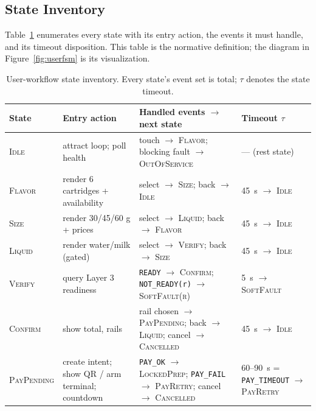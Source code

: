 \subsection{State Inventory}
\label{sec:stateinventory}

Table~\ref{tab:states} enumerates every state with its entry action, the
events it must handle, and its timeout disposition. This table is the
normative definition; the diagram in Figure~\ref{fig:userfsm} is its
visualization.

\begin{table}[htbp]
\centering
\caption{User-workflow state inventory. Every state's event set is total;
$\tau$ denotes the state timeout.}
\label{tab:states}
\footnotesize
\begin{tabular}{@{}p{2.6cm}p{3.3cm}p{4.6cm}p{3.2cm}@{}}
\toprule
\textbf{State} & \textbf{Entry action} & \textbf{Handled events $\rightarrow$ next state} & \textbf{Timeout $\tau$} \\
\midrule
\textsc{Idle} & attract loop; poll health & touch $\rightarrow$ \textsc{Flavor}; blocking fault $\rightarrow$ \textsc{OutOfService} & --- (rest state) \\
\addlinespace[2pt]
\textsc{Flavor} & render 6 cartridges + availability & select $\rightarrow$ \textsc{Size}; back $\rightarrow$ \textsc{Idle} & \SI{45}{\second} $\rightarrow$ \textsc{Idle} \\
\addlinespace[2pt]
\textsc{Size} & render 30/45/60 g + prices & select $\rightarrow$ \textsc{Liquid}; back $\rightarrow$ \textsc{Flavor} & \SI{45}{\second} $\rightarrow$ \textsc{Idle} \\
\addlinespace[2pt]
\textsc{Liquid} & render water/milk (gated) & select $\rightarrow$ \textsc{Verify}; back $\rightarrow$ \textsc{Size} & \SI{45}{\second} $\rightarrow$ \textsc{Idle} \\
\addlinespace[2pt]
\textsc{Verify} & query Layer 3 readiness & \texttt{READY} $\rightarrow$ \textsc{Confirm}; \texttt{NOT\_READY(r)} $\rightarrow$ \textsc{SoftFault(r)} & \SI{5}{\second} $\rightarrow$ \textsc{SoftFault} \\
\addlinespace[2pt]
\textsc{Confirm} & show total, rails & rail chosen $\rightarrow$ \textsc{PayPending}; back $\rightarrow$ \textsc{Liquid}; cancel $\rightarrow$ \textsc{Cancelled} & \SI{45}{\second} $\rightarrow$ \textsc{Idle} \\
\addlinespace[2pt]
\textsc{PayPending} & create intent; show QR / arm terminal; countdown & \texttt{PAY\_OK} $\rightarrow$ \textsc{Locked\-Prep}; \texttt{PAY\_FAIL} $\rightarrow$ \textsc{PayRetry}; cancel $\rightarrow$ \textsc{Cancelled} & 60--\SI{90}{\second} = \texttt{PAY\_TIMEOUT} $\rightarrow$ \textsc{PayRetry} \\

\end{tabular}
\end{table}
